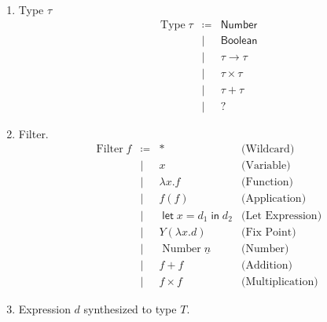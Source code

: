 \documentclass{article}
\newcommand{\entails}{\mathrel{\mathop{\vdash}}}
\newcommand{\class}[1]{\operatorname{#1}}
\newcommand{\fin}{\mathrel{\mathop{\mathsf{in}}}}
\newcommand{\flet}{\operatorname{\mathsf{let}}}
\newcommand{\synth}{\mathrel{\mathop{\Rightarrow}}}
\newcommand{\ctype}[1]{\mathsf{#1}}
\begin{document}
\begin{enumerate}
  \item \fbox{\(\class{Type} \tau\)} Type \(\tau\)
    \[
      \begin{array}{rcl}
        \class{Type} \tau
        &\coloneqq& \ctype{Number}\\
        &\mid& \ctype{Boolean}\\
        &\mid& \ctype{\tau \to \tau}\\
        &\mid& \ctype{\tau \times \tau}\\
        &\mid& \ctype{\tau + \tau}\\
        &\mid& \ctype{?}
      \end{array}
    \]
  \item {} Filter.
    \[
      \begin{array}{rcll}
        \class{Filter} f
        &\coloneqq& \ast & \text{(Wildcard)}\\
        &\mid& x & \text{(Variable)}\\
        &\mid& \lambda x . f & \text{(Function)}\\
        &\mid& f(f) & \text{(Application)}\\
        &\mid& \flet x = d_1 \fin d_2 & \text{(Let Expression)}\\
        &\mid& Y (\lambda x . d) & \text{(Fix Point)}\\
        &\mid& \class{Number} \underline{n} & \text{(Number)}\\
        &\mid& f + f & \text{(Addition)} \\
        &\mid& f \times f & \text{(Multiplication)}
      \end{array}
    \]
  \item \fbox{\(\Gamma \entails d \synth T\)} Expression \(d\)
    synthesized to type \(T\).


\end{enumerate}
\end{document}
